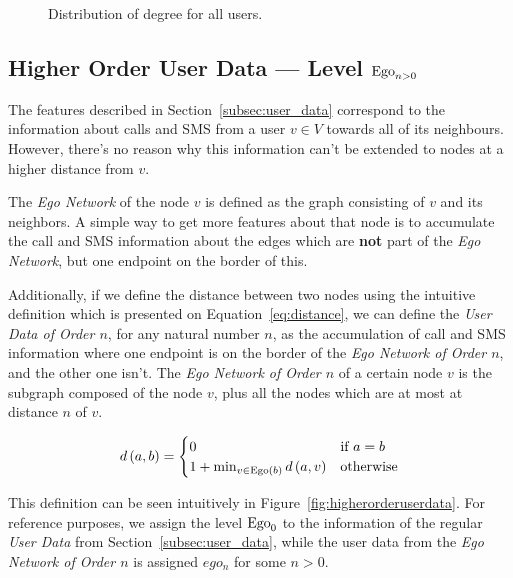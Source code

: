 \begin{figure}
\caption{Distribution of degree for all users.}
\label{fig:contacts}
\end{figure}

\subsection{Higher Order User Data --- Level $\operatorname{Ego}_{n > 0}$}
\label{subsec:higherorderuserdata}

The features described in Section~\ref{subsec:user_data} correspond to the information about calls and SMS from a user $v \in V$ towards all of its neighbours. However, there's no reason why this information can't be extended to nodes at a higher distance from $v$.

The \emph{Ego Network} of the node $v$ is defined as the graph consisting of $v$ and its neighbors. A simple way to get more features about that node is to accumulate the call and SMS information about the edges which are \textbf{not} part of the \emph{Ego Network}, but one endpoint on the border of this.

Additionally, if we define the distance between two nodes using the intuitive definition which is presented on Equation~\ref{eq:distance}, we can define the \emph{User Data of Order $n$}, for any natural number $n$, as the accumulation of call and SMS information where one endpoint is on the border of the \emph{Ego Network of Order $n$}, and the other one isn't. The \emph{Ego Network of Order $n$} of a certain node $v$ is the subgraph composed of the node $v$, plus all the nodes which are at most at distance $n$ of $v$.

\begin{equation}
d \left( a, b \right) =
\begin{cases}
	0 & \text{if } a = b \\
	1 + \min_{v \in \operatorname{Ego} \left(b \right)} d \left( a, v \right) & \text{otherwise}
\end{cases}
\label{eq:distance}
\end{equation}

This definition can be seen intuitively in Figure~\ref{fig:higherorderuserdata}. For reference purposes, we assign the level $\operatorname{Ego}_0$ to the information of the regular \emph{User Data} from Section~\ref{subsec:user_data}, while the user data from the \emph{Ego Network of Order $n$} is assigned $ego_n$ for some $n > 0$\footnotemark{}.

